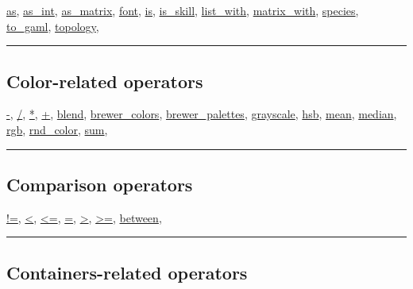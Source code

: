\documentclass[]{book}
\theoremstyle{definition}
\theoremstyle{definition}
\theoremstyle{definition}
\theoremstyle{remark}
\begin{document}
\href{OperatorsAA\#as}{as}, \href{OperatorsAA\#as_int}{as\_int},
\href{OperatorsAA\#as_matrix}{as\_matrix},
\href{OperatorsDH\#font}{font}, \href{OperatorsIM\#is}{is},
\href{OperatorsIM\#is_skill}{is\_skill},
\href{OperatorsIM\#list_with}{list\_with},
\href{OperatorsIM\#matrix_with}{matrix\_with},
\href{OperatorsSZ\#species}{species},
\href{OperatorsSZ\#to_gaml}{to\_gaml},
\href{OperatorsSZ\#topology}{topology},

\begin{center}\rule{0.5\linewidth}{\linethickness}\end{center}

\subsection{Color-related operators}\label{color-related-operators-4}

\href{OperatorsAA\#-}{-}, \href{OperatorsAA\#/}{/},
\href{OperatorsAA\#*}{*}, \href{OperatorsAA\#+}{+},
\href{OperatorsBC\#blend}{blend},
\href{OperatorsBC\#brewer_colors}{brewer\_colors},
\href{OperatorsBC\#brewer_palettes}{brewer\_palettes},
\href{OperatorsDH\#grayscale}{grayscale}, \href{OperatorsDH\#hsb}{hsb},
\href{OperatorsIM\#mean}{mean}, \href{OperatorsIM\#median}{median},
\href{OperatorsNR\#rgb}{rgb}, \href{OperatorsNR\#rnd_color}{rnd\_color},
\href{OperatorsSZ\#sum}{sum},

\begin{center}\rule{0.5\linewidth}{\linethickness}\end{center}

\subsection{Comparison operators}\label{comparison-operators-4}

\href{OperatorsAA\#!=}{!=}, \href{OperatorsAA\#\%3C}{\textless{}},
\href{OperatorsAA\#\%3C=}{\textless{}=}, \href{OperatorsAA\#=}{=},
\href{OperatorsAA\#\%3E}{\textgreater{}},
\href{OperatorsAA\#\%3E=}{\textgreater{}=},
\href{OperatorsBC\#between}{between},

\begin{center}\rule{0.5\linewidth}{\linethickness}\end{center}

\subsection{Containers-related
operators}\label{containers-related-operators-4}
\end{document}
